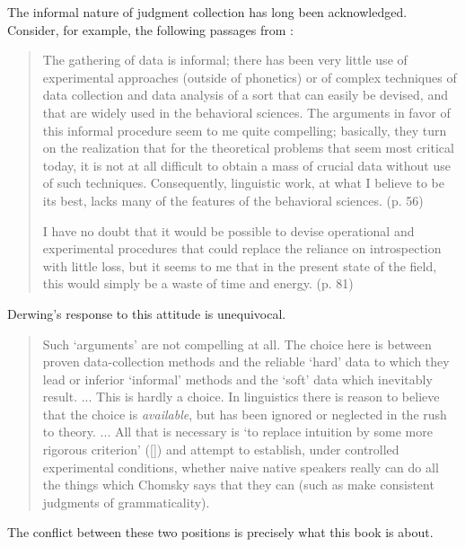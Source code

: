 The informal nature of judgment  collection  has long been  acknowledged. Consider, for example, the following passages from \citet{Chomsky1969}:

\begin{quote}
The gathering of data is informal; there has been very little use of experimental approaches (outside of phonetics) or of complex techniques of data collection and data analysis of a sort that can easily be devised, and that are widely used in the behavioral sciences. The arguments in favor of this informal procedure seem to me quite compelling; basically, they turn on the realization that for the theoretical problems that seem most critical today, it is not at all difficult to obtain a mass of crucial data without use of such techniques. Consequently, linguistic work, at what I believe to be its best, lacks many of the features of the behavioral sciences. (p. 56)


I have no doubt that it would be possible to devise operational and experimental procedures that could replace the reliance on introspection with little loss, but it seems to me that in the present state of the field, this would simply be a waste of time and energy. (p. 81)
\end{quote}

\noindent
Derwing's response to this attitude is unequivocal.

\begin{quote}
Such `arguments' are not compelling at all. The choice here is between proven data-collection methods and the reliable   `hard' data to which they lead or inferior `informal' methods and the `soft' data which inevitably result. ... This is hardly a choice. In linguistics there is reason to believe that the choice is \textit{available}, but has been ignored or neglected in the rush to theory. ... All that is necessary is `to replace intuition by some more rigorous criterion' ([\citealt[24]{Chomsky1962}]) and attempt to establish, under controlled experimental conditions, whether naive native speakers really can do all the things which Chomsky says that they can (such as make consistent judgments of grammaticality). \citep[250]{Derwing1973}
\end{quote}

\noindent
The conflict between these two positions is precisely what this book is about.

